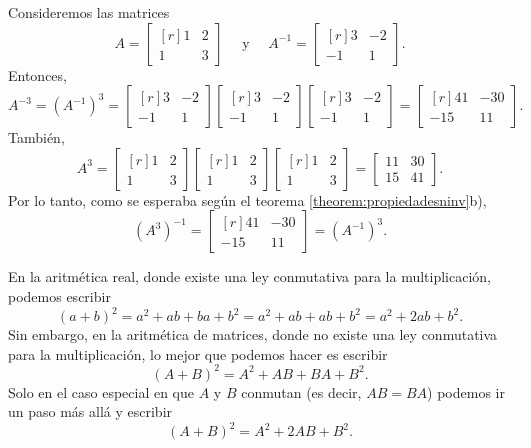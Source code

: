 \begin{examplebox}{}{}
    Consideremos las matrices
    $$A = \begin{bmatrix*}[r] 1 & 2 \\ 1 & 3 \end{bmatrix*} \quad \text{ y } \quad A^{-1} = \begin{bmatrix*}[r] 3 & -2 \\ -1 & 1 \end{bmatrix*}.$$
    Entonces,
    $$A^{-3} = \left(A^{-1}\right)^3 = \begin{bmatrix*}[r] 3 & -2 \\ -1 & 1 \end{bmatrix*} \begin{bmatrix*}[r] 3 & -2 \\ -1 & 1 \end{bmatrix*} \begin{bmatrix*}[r] 3 & -2 \\ -1 & 1 \end{bmatrix*} = \begin{bmatrix*}[r] 41 & -30 \\ -15 & 11 \end{bmatrix*}.$$
    También,
    $$A^3 = \begin{bmatrix*}[r] 1 & 2 \\ 1 & 3 \end{bmatrix*} \begin{bmatrix*}[r] 1 & 2 \\ 1 & 3 \end{bmatrix*} \begin{bmatrix*}[r] 1 & 2 \\ 1 & 3 \end{bmatrix*} = \begin{bmatrix} 11 & 30 \\ 15 & 41 \end{bmatrix}.$$
    Por lo tanto, como se esperaba según el teorema \ref{theorem:propiedadesninv}b),
    $$\left(A^3\right)^{-1} = \begin{bmatrix*}[r] 41 & -30 \\ -15 & 11 \end{bmatrix*} = \left(A^{-1}\right)^3.$$
\end{examplebox}

\begin{examplebox}{}{}
    En la aritmética real, donde existe una ley conmutativa para la multiplicación, podemos escribir
    $$(a + b)^2 = a^2 + ab + ba + b^2 = a^2 + ab + ab + b^2 = a^2 + 2ab + b^2.$$
    Sin embargo, en la aritmética de matrices, donde no existe una ley conmutativa para la multiplicación, lo mejor que podemos hacer es escribir
    $$(A + B)^2 = A^2 + AB + BA + B^2.$$
    Solo en el caso especial en que $A$ y $B$ conmutan (es decir, $AB = BA$) podemos ir un paso más allá y escribir
    $$(A + B)^2 = A^2 + 2AB + B^2.$$
\end{examplebox}

